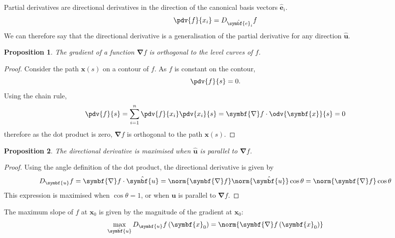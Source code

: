 \documentclass{article}
\newtheorem{proposition}{Proposition}[subsection]
\begin{document}
\begin{remark}
    Partial derivatives are directional derivatives in the direction of the canonical basis vectors \(\hat{\symbf{e}}_i\).
    \begin{equation*}
        \pdv{f}{x_i} = D_{\hat{\symbf{e}}_i} f
    \end{equation*}
    We can therefore say that the directional derivative is a generalisation of the partial derivative
    for any direction \(\hat{\symbf{u}}\).
\end{remark}
\begin{proposition}
    The gradient of a function \(\symbf{\nabla} f\) is orthogonal to the level curves of \(f\).
\end{proposition}
\begin{proof}
    Consider the path \(\symbf{x}\left( s \right)\) on a contour of \(f\). As \(f\) is constant on the contour,
    \begin{equation*}
        \pdv{f}{s} = 0.
    \end{equation*}
    Using the chain rule,
    \begin{equation*}
        \pdv{f}{s} = \sum_{i = 1}^n \pdv{f}{x_i} \pdv{x_i}{s} = \symbf{\nabla} f \cdot \odv{\symbf{x}}{s} = 0
    \end{equation*}
    therefore as the dot product is zero, \(\symbf{\nabla} f\) is orthogonal to the path \(\symbf{x}\left( s \right)\).
\end{proof}
\begin{proposition}
    The directional derivative is maximised when \(\hat{\symbf{u}}\) is parallel to \(\symbf{\nabla} f\).
\end{proposition}
\begin{proof}
    Using the angle definition of the dot product, the directional derivative is given by
    \begin{equation*}
        D_{\symbf{u}} f = \symbf{\nabla} f \cdot \hat{\symbf{u}} = \norm{\symbf{\nabla} f} \norm{\hat{\symbf{u}}} \cos{\theta} = \norm{\symbf{\nabla} f} \cos{\theta}
    \end{equation*}
    This expression is maximised when \(\cos{\theta} = 1\), or when \(\symbf{u}\) is parallel to \(\symbf{\nabla} f\).
\end{proof}
\begin{remark}
    The maximum slope of \(f\) at \(\symbf{x}_0\) is given by the magnitude of the gradient at \(\symbf{x}_0\):
    \begin{equation*}
        \max_{\hat{\symbf{u}}} D_{\symbf{u}} f\left( \symbf{x}_0 \right) = \norm{\symbf{\nabla} f\left( \symbf{x}_0 \right)}
    \end{equation*}
\end{remark}
\end{document}
